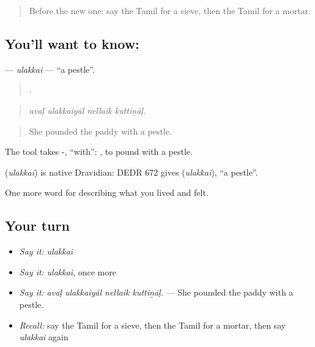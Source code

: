 \label{lesson:TA-C524-ulakkai}



\begin{quote}
Before the new one: say the Tamil for a sieve, then the Tamil for a mortar.
\end{quote}

\subsection*{You'll want to know: }
\textbf{} — \emph{ulakkai} — \textquotedblleft{}a pestle\textquotedblright{}.

\begin{quote}
   .
\end{quote}

\begin{quote}
\emph{avaḷ ulakkaiyāl nellaik kuttiṉāḷ.}
\end{quote}

\begin{quote}
She pounded the paddy with a pestle.
\end{quote}

The tool takes -, \textquotedblleft{}with\textquotedblright{}:  , to pound with a pestle.

\begin{cousinweb}
\textbf{} (\emph{ulakkai}) is native Dravidian: DEDR 672 gives  (\emph{ulakkai}), \textquotedblleft{}a pestle\textquotedblright{}.
\end{cousinweb}

\begin{grammarlens}[title={What you've built}]
One more word for describing what you lived and felt.
\end{grammarlens}

\subsection*{Your turn}
\begin{itemize}
\raggedright
  \item \emph{Say it:} \emph{ulakkai}
  \item \emph{Say it:} \emph{ulakkai}, once more
  \item \emph{Say it:} \emph{avaḷ ulakkaiyāl nellaik kuttiṉāḷ.} — She pounded the paddy with a pestle.
  \item \emph{Recall:} say the Tamil for a sieve, then the Tamil for a mortar, then say \emph{ulakkai} again
\end{itemize}

